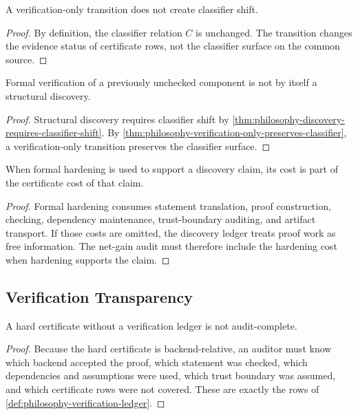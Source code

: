 \begin{theorem}
\label{thm:philosophy-verification-only-preserves-classifier}
A verification-only transition does not create classifier shift.
\end{theorem}
\begin{proof}
By definition, the classifier relation $C$ is unchanged. The transition
changes the evidence status of certificate rows, not the classifier
surface on the common source.
\end{proof}

\begin{corollary}
\label{cor:philosophy-formal-verification-not-discovery}
Formal verification of a previously unchecked component is not by itself
a structural discovery.
\end{corollary}
\begin{proof}
Structural discovery requires classifier shift by
\autoref{thm:philosophy-discovery-requires-classifier-shift}. By
\autoref{thm:philosophy-verification-only-preserves-classifier}, a
verification-only transition preserves the classifier surface.
\end{proof}

\begin{theorem}
\label{thm:philosophy-hardening-costs-enter-discovery-accounting}
When formal hardening is used to support a discovery claim, its cost is
part of the certificate cost of that claim.
\end{theorem}
\begin{proof}
Formal hardening consumes statement translation, proof construction,
checking, dependency maintenance, trust-boundary auditing, and artifact
transport. If those costs are omitted, the discovery ledger treats proof
work as free information. The net-gain audit must therefore include the
hardening cost when hardening supports the claim.
\end{proof}

\subsection{Verification Transparency}
\label{subsec:philosophy-verification-transparency}

\begin{theorem}
\label{thm:philosophy-hard-certificates-require-verification-ledgers}
A hard certificate without a verification ledger is not audit-complete.
\end{theorem}
\begin{proof}
Because the hard certificate is backend-relative, an auditor must know
which backend accepted the proof, which statement was checked, which
dependencies and assumptions were used, which trust boundary was assumed,
and which certificate rows were not covered. These are exactly the rows
of \autoref{def:philosophy-verification-ledger}.
\end{proof}


